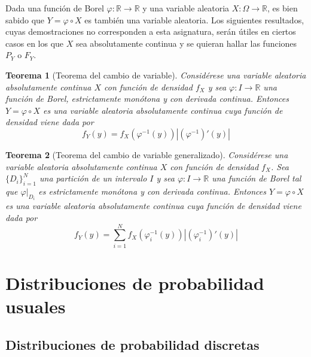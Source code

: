 \documentclass[11pt]{report}
\theoremstyle{mytheorem}
\newtheorem{theorem}{Teorema}
\theoremstyle{mydefinition}
\theoremstyle{myexample}
\newenvironment{ctheorem} %
  {\begin{mdframed}[
        linewidth=3pt,
        linecolor=c2,
        bottomline=false,
        topline=false,
        rightline=false,
        innerrightmargin=0pt,
        innertopmargin=0pt,
        innerbottommargin=0pt,
        innerleftmargin=1em,
        skipabove=\baselineskip]
    \begin{theorem}}
  {\end{theorem}\end{mdframed}}
\newcommand{\R}{\mathbb R}
\begin{document}
\vspace{-0.5\baselineskip}

Dada una función de Borel $\varphi \colon \R \to \R$ y una variable aleatoria $X \colon \Omega \to \R$, es bien sabido que $Y = \varphi \circ X$ es también una variable aleatoria. Los siguientes resultados, cuyas demostraciones no corresponden a esta asignatura, serán útiles en ciertos casos en los que $X$ sea absolutamente continua y se quieran hallar las funciones $P_Y$ o $F_Y$.

\begin{ctheorem}[{Teorema del cambio de variable}]
\label{teo3.1.}
Considérese una variable aleatoria absolutamente continua $X$ con función de densidad $f_X$ y sea $\varphi \colon I \to \R$ una función de Borel, estrictamente monótona y con derivada continua. Entonces $Y = \varphi \circ X$ es una variable aleatoria absolutamente continua cuya función de densidad viene dada por
\[f_Y(y) = f_X(\varphi^{-1}(y)) |(\varphi^{-1})'(y)|\]
\end{ctheorem}

\begin{ctheorem}[{Teorema del cambio de variable generalizado}]
Considérese una variable aleatoria absolutamente continua $X$ con función de densidad $f_X$. Sea $\{D_i\}_{i=1}^N$ una partición de un intervalo $I$ y sea $\varphi \colon I \to \R$ una función de Borel tal que $\varphi|_{D_i}$ es estrictamente monótona y con derivada continua. Entonces $Y = \varphi \circ X$ es una variable aleatoria absolutamente continua cuya función de densidad viene dada por   
\[f_Y(y) = \sum_{i=1}^N f_X(\varphi^{-1}_i(y)) |(\varphi^{-1}_i)'(y)|\]
\end{ctheorem}

\chapter{Distribuciones de probabilidad usuales}

\section{Distribuciones de probabilidad discretas}
\end{document}
